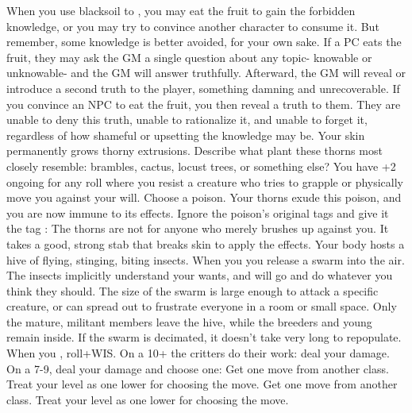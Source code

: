 \documentclass[darkmode]{dw_playbook}
\begin{document}
\pageThree
    {
        \advancedMovesCont
    }
    {
            {When you use blacksoil to , you may eat the fruit to gain the forbidden knowledge, or you may try to convince another character to consume it.  But remember, some knowledge is better avoided, for your own sake.
            \gap
            If a PC eats the fruit, they may ask the GM a single question about any topic- knowable or unknowable- and the GM will answer truthfully.  Afterward, the GM will reveal or introduce a second truth to the player, something damning and unrecoverable.
            \gap
            If you convince an NPC to eat the fruit, you then reveal a truth to them.  They are unable to deny this truth, unable to rationalize it, and unable to forget it, regardless of how shameful or upsetting the knowledge may be.}
        \gap
            {
            \gapSm
            Your skin permanently grows thorny extrusions.  Describe what plant these thorns most closely resemble: brambles, cactus, locust trees, or something else?  You have +2 ongoing for any roll where you resist a creature who tries to grapple or physically move you against your will.
            \gap
            Choose a poison.  Your thorns exude this poison, and you are now immune to its effects.  Ignore the poison's original tags and give it the tag :  The thorns are not  for anyone who merely brushes up against you.  It takes a good, strong stab that breaks skin to apply the effects.}
            {
            \gapSm
            Your body hosts a hive of flying, stinging, biting insects. When you  you release a swarm into the air.  The insects implicitly understand your wants, and will go and do whatever you think they should.  The size of the swarm is large enough to attack a specific creature, or can spread out to frustrate everyone in a room or small space.  Only the mature, militant members leave the hive, while the breeders and young remain inside.  If the swarm is decimated, it doesn’t take very long to repopulate.
            \gap
            When you , roll+WIS.  On a 10+ the critters do their work: deal your damage.  On a 7-9, deal your damage and choose one:
            \gapSm
            \gapSm
            \gapSm
            }
        \gap
            {Get one move from another class. Treat your level as one lower for choosing the move.}
        \gap
            {Get one move from another class. Treat your level as one lower for choosing the move.}
    }
    {
        ~
    }
\end{document}
